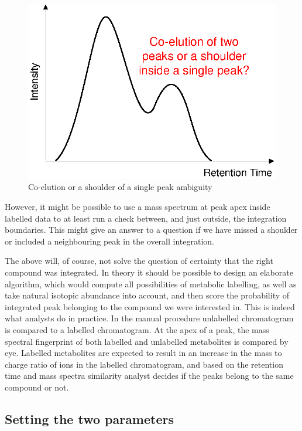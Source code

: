 \begin{figure}
  \begin{center}
    \includegraphics[scale=0.7]{graphics/chapter08/90.eps}
  \end{center}
  \caption{Co-elution or a shoulder of a single peak ambiguity}
  \label{fig:90}
\end{figure}

However, it might be possible to use a mass spectrum at peak apex inside labelled
data to at least run a check between, and just outside, the integration boundaries.
This might give an answer to a question if we have missed a shoulder or included
a neighbouring peak in the overall integration. 

The above will, of course, not solve the question of certainty that the right 
compound was integrated. In theory it should be possible to design an elaborate 
algorithm, which would compute all possibilities of metabolic labelling, as 
well as take natural isotopic abundance into account, and then score the 
probability of integrated peak belonging to the compound we were interested in. 
This is indeed what analysts do in practice. In the manual procedure unlabelled 
chromatogram is compared to a labelled chromatogram. At the apex of a peak, the 
mass spectral fingerprint of both labelled and unlabelled metabolites is 
compared by eye. Labelled metabolites are expected to result in an increase in 
the mass to charge ratio of ions in the labelled chromatogram, and based on the 
retention time and mass spectra similarity analyst decides if the peaks belong 
to the same compound or not.

\subsection{Setting the two parameters}

